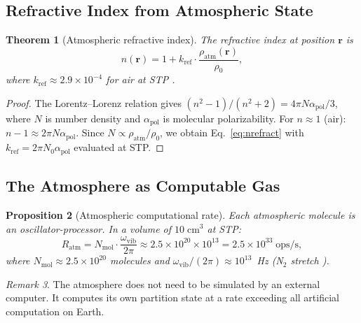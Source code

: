 \documentclass[10pt,twocolumn]{article}
\newtheorem{theorem}{Theorem}[section]
\newtheorem{proposition}[theorem]{Proposition}
\theoremstyle{definition}
\theoremstyle{remark}
\newtheorem{remark}[theorem]{Remark}
\begin{document}
\subsection{Refractive Index from Atmospheric State}
\label{sec:refraction}

\begin{theorem}[Atmospheric refractive index]
\label{thm:refraction}
The refractive index at position $\mathbf{r}$ is
\begin{equation}\label{eq:nrefract}
  n(\mathbf{r}) = 1 + k_{\mathrm{ref}}\cdot
  \frac{\rho_{\mathrm{atm}}(\mathbf{r})}{\rho_0},
\end{equation}
where $k_{\mathrm{ref}}\approx 2.9\times 10^{-4}$ for air at
STP \citep{Liou2002}.
\end{theorem}

\begin{proof}
The Lorentz--Lorenz relation gives
$(n^2-1)/(n^2+2)=4\pi N\alpha_{\mathrm{pol}}/3$, where $N$
is number density and $\alpha_{\mathrm{pol}}$ is molecular
polarizability.  For $n\approx 1$ (air): $n-1\approx
2\pi N\alpha_{\mathrm{pol}}$.  Since $N\propto
\rho_{\mathrm{atm}}/\rho_0$, we obtain
Eq.~\eqref{eq:nrefract} with $k_{\mathrm{ref}}=2\pi
N_0\alpha_{\mathrm{pol}}$ evaluated at STP.
\end{proof}

\subsection{The Atmosphere as Computable Gas}
\label{sec:atmos_compute}

\begin{proposition}[Atmospheric computational rate]
\label{prop:atmos_compute}
Each atmospheric molecule is an oscillator-processor.  In a
volume of $10\;\mathrm{cm}^3$ at STP:
\begin{equation}\label{eq:atmos_rate}
  R_{\mathrm{atm}}
  = N_{\mathrm{mol}}\cdot\frac{\omega_{\mathrm{vib}}}{2\pi}
  \approx 2.5\times 10^{20}\times 10^{13}
  = 2.5\times 10^{33}\;\mathrm{ops/s},
\end{equation}
where $N_{\mathrm{mol}}\approx 2.5\times 10^{20}$ molecules
and $\omega_{\mathrm{vib}}/(2\pi)\approx 10^{13}$~Hz (N$_2$
stretch \citep{Herzberg1945}).
\end{proposition}

\begin{remark}
The atmosphere does not need to be simulated by an external
computer.  It computes its own partition state at a rate
exceeding all artificial computation on Earth.
\end{remark}
\end{document}
